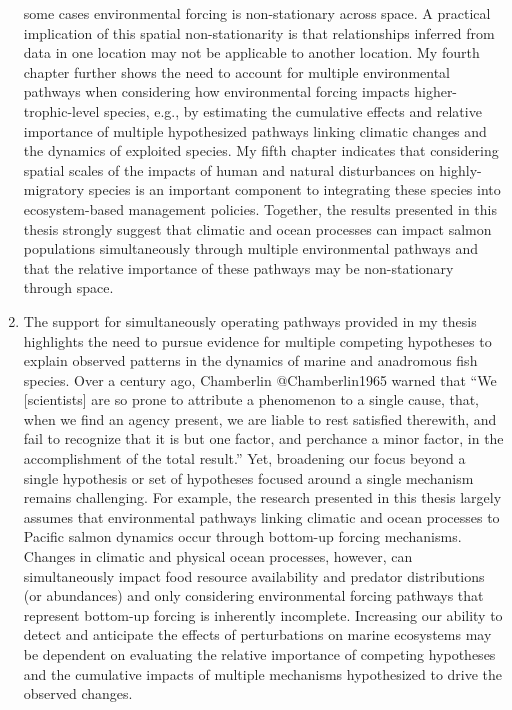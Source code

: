 \begin{enumerate}
  some cases environmental forcing is non-stationary across space. A
  practical implication of this spatial non-stationarity is that
  relationships inferred from data in one location may not be applicable
  to another location. My fourth chapter further shows the need to
  account for multiple environmental pathways when considering how
  environmental forcing impacts higher-trophic-level species, e.g., by
  estimating the cumulative effects and relative importance of multiple
  hypothesized pathways linking climatic changes and the dynamics of
  exploited species. My fifth chapter indicates that considering spatial
  scales of the impacts of human and natural disturbances on
  highly-migratory species is an important component to integrating
  these species into ecosystem-based management policies. Together, the
  results presented in this thesis strongly suggest that climatic and
  ocean processes can impact salmon populations simultaneously through
  multiple environmental pathways and that the relative importance of
  these pathways may be non-stationary through space.
\item
  The support for simultaneously operating pathways provided in my
  thesis highlights the need to pursue evidence for multiple competing
  hypotheses to explain observed patterns in the dynamics of marine and
  anadromous fish species. Over a century ago, Chamberlin
  @Chamberlin1965 warned that ``We {[}scientists{]} are so prone to
  attribute a phenomenon to a single cause, that, when we find an agency
  present, we are liable to rest satisfied therewith, and fail to
  recognize that it is but one factor, and perchance a minor factor, in
  the accomplishment of the total result.'' Yet, broadening our focus
  beyond a single hypothesis or set of hypotheses focused around a
  single mechanism remains challenging. For example, the research
  presented in this thesis largely assumes that environmental pathways
  linking climatic and ocean processes to Pacific salmon dynamics occur
  through bottom-up forcing mechanisms. Changes in climatic and physical
  ocean processes, however, can simultaneously impact food resource
  availability and predator distributions (or abundances) and only
  considering environmental forcing pathways that represent bottom-up
  forcing is inherently incomplete. Increasing our ability to detect and
  anticipate the effects of perturbations on marine ecosystems may be
  dependent on evaluating the relative importance of competing
  hypotheses and the cumulative impacts of multiple mechanisms
  hypothesized to drive the observed changes.

\end{enumerate}

